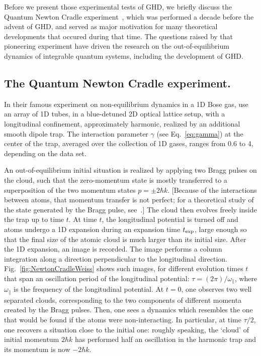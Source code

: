 \documentclass[onecolumn,amsfonts,showpacs,superscriptaddress]{revtex4-1}
\begin{document}
Before we present those experimental tests of GHD, 
we briefly discuss the Quantum Newton Cradle experiment~\citep{kinoshita2006quantum}, which was performed a decade before the advent of GHD, and served as major motivation for many theoretical developments that occured during that time. The questions raised by that pioneering experiment have driven the research on the out-of-equilibrium dynamics of integrable quantum systems, including the development of GHD.

\subsection{The Quantum Newton Cradle experiment.}
\label{subsection:NewtonCradle}
In their famous experiment on non-equilibrium dynamics in a 1D Bose gas, \cite{kinoshita2006quantum} use an array of 1D tubes, in a blue-detuned 2D optical lattice setup, with a longitudinal confinement, approximately harmonic, realized by an additional smooth dipole trap. The  
interaction parameter $\gamma$ (see Eq.~\ref{eq:gamma}) at the center of the trap, averaged over the collection of 1D gases, ranges from 0.6 to 4, depending on the data set. 

An out-of-equilibrium initial situation is realized by applying two Bragg pulses on the cloud, such that the zero-momentum state is mostly transferred to a superposition of the two momentum states $p=\pm 2\hbar k$. [Because of the interactions between atoms, that momentum transfer is not perfect; for a theoretical study of the state generated by the Bragg pulse, see~\citep{van2016separation}.] %
The cloud then evolves freely inside the trap up to time $t$.
At time $t$, the longitudinal potential is turned off and atoms
undergo a 1D expansion during an expansion time $t_{\rm exp}$, large enough so that the final size of the atomic cloud is much larger than its initial size. After the 1D expansion,  an image is recorded. The image performs a column integration along a direction perpendicular to the longitudinal direction. Fig.~\ref{fig:NewtonCradleWeiss} shows such images, for different evolution times $t$ that span an oscillation period of the longitudinal potential: $\tau=(2\pi)/\omega_\parallel$,
where $\omega_\parallel$ is the frequency of the longitudinal potential.
At $t=0$, one observes two well separated clouds, corresponding to the two components of different momenta created by the Bragg pulses. Then, one sees a dynamics which resembles the one that would be found if the atoms were non-interacting. In particular, at time $\tau/2$, one recovers a situation close to the initial one: roughly speaking, the `cloud' of initial momentum $2\hbar k$
has performed half an oscillation in the harmonic trap and its momentum is now $-2\hbar k$.
\end{document}
